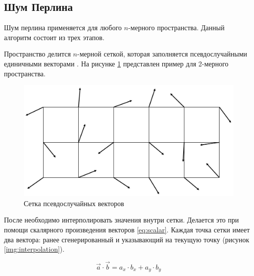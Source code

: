 \subsection{Шум Перлина}

Шум перлина применяется для любого $n$-мерного пространства. Данный алгоритм состоит из трех этапов.

Пространство делится $n$-мерной сеткой, которая заполняется псевдослучайными единичными векторами \cite{Perlin}.
На рисунке \ref{img:vectors} представлен пример для 2-мерного пространства.

\begin{figure}[H]
    \centering
    \includegraphics[scale=0.6]{img/vectors.png}
    \caption{Сетка псевдослучайных векторов}
    \label{img:vectors}
\end{figure}

После необходимо интерполировать значения внутри сетки. Делается это при помощи скалярного произведения векторов \ref{eq:scalar}.
Каждая точка сетки имеет два вектора: ранее сгенерированный и указывающий на текущую точку \cite{Perlin} (рисунок \ref{img:interpolation}).

\begin{equation}\label{eq:scalar}
    \vec a \cdot \vec b = a_x \cdot b_x + a_y \cdot b_y
\end{equation}

